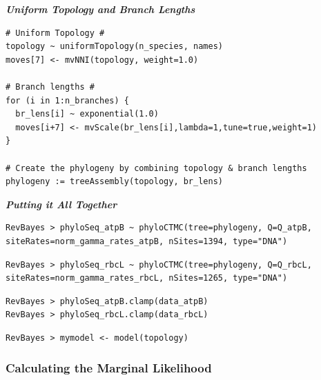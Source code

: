 \documentclass[11pt]{article}
\begin{document}
\textbf{\textit{Uniform Topology and Branch Lengths}}

{\tt \begin{snugshade*}
\begin{lstlisting}
# Uniform Topology #
topology ~ uniformTopology(n_species, names)
moves[7] <- mvNNI(topology, weight=1.0)

# Branch lengths #
for (i in 1:n_branches) {
  br_lens[i] ~ exponential(1.0)
  moves[i+7] <- mvScale(br_lens[i],lambda=1,tune=true,weight=1) 
}

# Create the phylogeny by combining topology & branch lengths
phylogeny := treeAssembly(topology, br_lens)
\end{lstlisting}
\end{snugshade*}}

\textbf{\textit{Putting it All Together}}

{\tt \begin{snugshade*}
\begin{lstlisting}
RevBayes > phyloSeq_atpB ~ phyloCTMC(tree=phylogeny, Q=Q_atpB, siteRates=norm_gamma_rates_atpB, nSites=1394, type="DNA")
\end{lstlisting}
\end{snugshade*}}

{\tt \begin{snugshade*}
\begin{lstlisting}
RevBayes > phyloSeq_rbcL ~ phyloCTMC(tree=phylogeny, Q=Q_rbcL, siteRates=norm_gamma_rates_rbcL, nSites=1265, type="DNA")
\end{lstlisting}
\end{snugshade*}}

{\tt \begin{snugshade*}
\begin{lstlisting}
RevBayes > phyloSeq_atpB.clamp(data_atpB)
RevBayes > phyloSeq_rbcL.clamp(data_rbcL)
\end{lstlisting}
\end{snugshade*}}

{\tt \begin{snugshade*}
\begin{lstlisting}
RevBayes > mymodel <- model(topology)
\end{lstlisting}
\end{snugshade*}}

\subsubsection*{Calculating the Marginal Likelihood}
\end{document}
